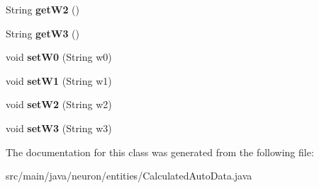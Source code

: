 \begin{DoxyCompactItemize}
String {\bfseries get\+W2} ()
\item 
\mbox{\label{classneuron_1_1entities_1_1CalculatedAutoData_a5b08496599d7799617643c2fdb4bfcbb}} 
String {\bfseries get\+W3} ()
\item 
\mbox{\label{classneuron_1_1entities_1_1CalculatedAutoData_aa5135ab158cfc4db494ba13557c604da}} 
void {\bfseries set\+W0} (String w0)
\item 
\mbox{\label{classneuron_1_1entities_1_1CalculatedAutoData_a26c37d1dbe9f57d54574bcb4f97b3495}} 
void {\bfseries set\+W1} (String w1)
\item 
\mbox{\label{classneuron_1_1entities_1_1CalculatedAutoData_a75c0f18701f08428a5b00e91b821597a}} 
void {\bfseries set\+W2} (String w2)
\item 
\mbox{\label{classneuron_1_1entities_1_1CalculatedAutoData_a9f111306451b34c8b4c57273f85be4d1}} 
void {\bfseries set\+W3} (String w3)
\end{DoxyCompactItemize}


The documentation for this class was generated from the following file\+:\begin{DoxyCompactItemize}
\item 
src/main/java/neuron/entities/Calculated\+Auto\+Data.\+java\end{DoxyCompactItemize}
